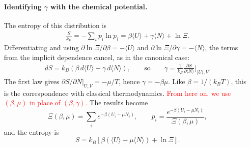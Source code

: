 \paragraph{Identifying $\gamma$ with the chemical potential.}
The entropy of this distribution is
\begin{align*}
    \frac{S}{k_B}=-\sum_i p_i\ln p_i
    =\beta\langle U\rangle+\gamma\langle N\rangle+\ln\Xi.
\end{align*}
Differentiating and using $\partial\ln\Xi/\partial\beta=-\langle U\rangle$ and
$\partial\ln\Xi/\partial\gamma=-\langle N\rangle$, the terms from the implicit
dependence cancel, as in the canonical case:
\begin{align*}
    dS=k_B\left(\beta\,d\langle U\rangle+\gamma\,d\langle N\rangle\right),
    \qquad\text{so}\qquad
    \gamma=\frac{1}{k_B}\frac{\partial S}{\partial\langle N\rangle}\bigg|_{\langle U\rangle,V}.
\end{align*}
The first law gives $\partial S/\partial N|_{U,V}=-\mu/T$, hence
$\gamma=-\beta\mu$. Like $\beta=1/(k_BT)$, this is the correspondence with
classical thermodynamics. \textcolor{red}{From here on, we use $(\beta,\mu)$ in
place of $(\beta,\gamma)$.} The results become
\begin{equation}
    \boxed{\Xi(\beta,\mu)=\sum_i e^{-\beta(U_i-\mu N_i)},
    \qquad
    p_i=\frac{e^{-\beta(U_i-\mu N_i)}}{\Xi(\beta,\mu)},}
\end{equation}
and the entropy is
\begin{equation}
    \boxed{S=k_B\left[\beta\left(\langle U\rangle-\mu\langle N\rangle\right)+\ln\Xi\right].}
\end{equation}

